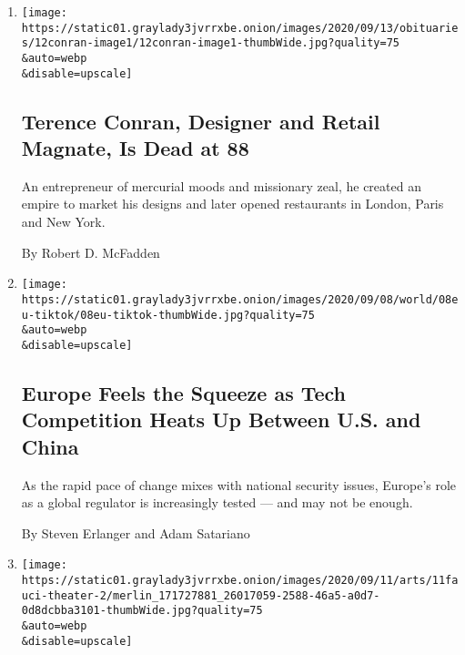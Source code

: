 \begin{enumerate}
\def\labelenumi{\arabic{enumi}.}
\item
  \href{/2020/09/12/business/terence-conran-dead.html}{}

  \texttt{[image: https://static01.graylady3jvrrxbe.onion/images/2020/09/13/obituaries/12conran-image1/12conran-image1-thumbWide.jpg?quality=75\\\&auto=webp\\\&disable=upscale]}

  \hypertarget{terence-conran-designer-and-retail-magnate-is-dead-at-88}{%
  \subsection{Terence Conran, Designer and Retail Magnate, Is Dead at
  88}\label{terence-conran-designer-and-retail-magnate-is-dead-at-88}}

  An entrepreneur of mercurial moods and missionary zeal, he created an
  empire to market his designs and later opened restaurants in London,
  Paris and New York.

  By Robert D. McFadden
\item
  \href{/2020/09/11/world/europe/eu-us-china-technology.html}{}

  \texttt{[image: https://static01.graylady3jvrrxbe.onion/images/2020/09/08/world/08eu-tiktok/08eu-tiktok-thumbWide.jpg?quality=75\\\&auto=webp\\\&disable=upscale]}

  \hypertarget{europe-feels-the-squeeze-as-tech-competition-heats-up-between-us-and-china}{%
  \subsection{Europe Feels the Squeeze as Tech Competition Heats Up
  Between U.S. and
  China}\label{europe-feels-the-squeeze-as-tech-competition-heats-up-between-us-and-china}}

  As the rapid pace of change mixes with national security issues,
  Europe's role as a global regulator is increasingly tested --- and may
  not be enough.

  By Steven Erlanger and Adam Satariano
\item
  \href{/2020/09/11/theater/fauci-theater-reopen.html}{}

  \texttt{[image: https://static01.graylady3jvrrxbe.onion/images/2020/09/11/arts/11fauci-theater-2/merlin\_171727881\_26017059-2588-46a5-a0d7-0d8dcbba3101-thumbWide.jpg?quality=75\\\&auto=webp\\\&disable=upscale]}

  \hypertarget{fauci-says-it-could-be-a-year-before-theater-without-masks-feels-normal}{%
}
\end{enumerate}
